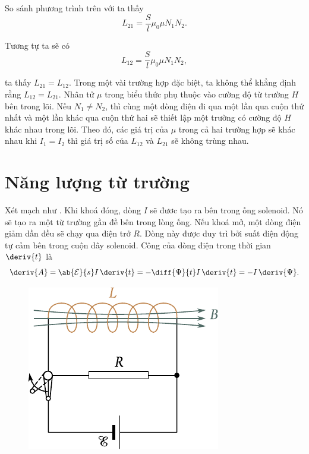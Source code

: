\noindent
So sánh phương trình trên với  ta thấy
\begin{equation}\label{eq:8_32}
	L_{21} = \frac{S}{l} \mu_0 \mu N_1 N_2.
\end{equation}

Tương tự ta sẽ có
\begin{equation}\label{eq:8_33}
	L_{12} = \frac{S}{l} \mu_0 \mu N_1 N_2,
\end{equation}

\noindent
ta thấy $L_{21} = L_{12}$.
Trong một vài trường hợp đặc biệt, ta không thể khẳng định rằng $L_{12}=L_{21}$. Nhân tử $\mu$ trong biểu thức phụ thuộc vào cường độ từ trường $H$ bên trong lõi.
Nếu $N_1\neq N_2$, thì cùng một dòng điện đi qua một lần qua cuộn thứ nhất và một lần khác qua cuộn thứ hai sẽ thiết lập một trường có cường độ $H$ khác nhau trong lõi.
Theo đó, các giá trị của $\mu$ trong cả hai trường hợp sẽ khác nhau khi $I_1=I_2$ thì giá trị số của $L_{12}$ và $L_{21}$ sẽ không trùng nhau.

\section{Năng lượng từ trường}\label{sec:8_8}

Xét mạch như .
Khi khoá đóng, dòng $I$ sẽ đươc tạo ra bên trong ống solenoid.
Nó sẽ tạo ra một từ trường gần đề bên trong lòng ống.
Nếu khoá mở, một dòng điện giảm dần đều sẽ chạy qua điện trở $R$.
Dòng này được duy trì bởi suất điện động tự cảm bên trong cuộn dây solenoid.
Công của dòng điện trong thời gian $\deriv{t}$ là
\begin{equation}\label{eq:8_34}
	\deriv{A} = \ab{\mathcal{E}}{s} I\, \deriv{t} = -\diff{\Psi}{t} I\, \deriv{t} = -I\, \deriv{\Psi}.
\end{equation}

\begin{figure}[!h]
	\begin{center}
		\includegraphics[scale=0.95]{figures/ch_08/fig_8_11.pdf}
		\caption[]{}
		\label{fig:8_11}
	\end{center}
	\vspace{-0.8cm}
\end{figure}

